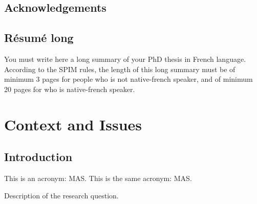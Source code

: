 \documentclass[english]{spimutbmphdthesis}
\begin{document}
\frontmatter

\chapter*{Acknowledgements}

\tableofcontents

\chapter*{R\'esum\'e long}

\begin{upmcaution}
	You must write here a long summary of your PhD thesis in French language.
	According to the SPIM rules, the length of this long summary must be of minimum 3 pages for people who is not native-french speaker, and of minimum 20 pages for who is native-french speaker.
\end{upmcaution}


\printacronyms

\mainmatter

\part{Context and Issues}

\chapter{Introduction}

This is an acronym: \ac{MAS}.
This is the same acronym: \ac{MAS}.

\begin{researchquestion}[a name]
   Description of the research question.
\end{researchquestion}
\end{document}
